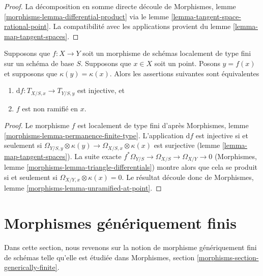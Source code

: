 \begin{proof}
La décomposition en somme directe découle de Morphismes,
lemme \ref{morphisms-lemma-differential-product} via le lemme
\ref{lemma-tangent-space-rational-point}. La compatibilité avec
les applications provient du lemme \ref{lemma-map-tangent-spaces}.
\end{proof}

\begin{lemma}
\label{lemma-injective-tangent-spaces-unramified}
Supposons que $f : X \to Y$ soit un morphisme de schémas localement de type fini sur
un schéma de base $S$. Supposons que $x \in X$ soit un point. Posons $y = f(x)$ et
supposons que $\kappa(y) = \kappa(x)$. Alors les assertions suivantes sont équivalentes
\begin{enumerate}
\item $\text{d}f : T_{X/S, x} \longrightarrow T_{Y/S, y}$ est injective, et
\item $f$ est non ramifié en $x$.
\end{enumerate}
\end{lemma}

\begin{proof}
Le morphisme $f$ est localement de type fini d'après
Morphismes, lemme
\ref{morphisms-lemma-permanence-finite-type}. L'application
$\text{d}f$ est injective si et seulement si $\Omega_{Y/S, y}
\otimes \kappa(y) \to \Omega_{X/S, x} \otimes \kappa(x)$ est
surjective (lemme \ref{lemma-map-tangent-spaces}). La suite
exacte $f^*\Omega_{Y/S} \to \Omega_{X/S} \to \Omega_{X/Y} \to
0$ (Morphismes, lemme
\ref{morphisms-lemma-triangle-differentials}) montre alors que cela se
produit si et seulement si $\Omega_{X/Y, x} \otimes \kappa(x) = 0$. Le
résultat découle donc de Morphismes, lemme \ref{morphisms-lemma-unramified-at-point}.
\end{proof}







\section{Morphismes génériquement finis}
\label{section-generically-finite}

\noindent
Dans cette section, nous revenons sur la notion de
morphisme génériquement fini de schémas telle qu'elle est étudiée dans
Morphismes, section \ref{morphisms-section-generically-finite}.

